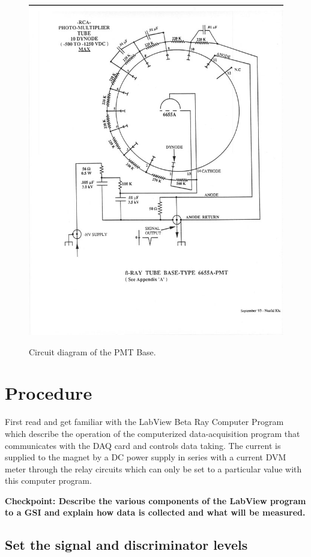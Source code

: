 \documentclass{../lab}
\begin{document}
\begin{figure}[h]
    \centering
    \href{http://experimentationlab.berkeley.edu/sites/default/files/images/RCA6655A_PMT_3.jpg}{\includegraphics[width=0.5\linewidth]{images/RCA6655A_PMT_3.jpg}}
    \caption{Circuit diagram of the PMT Base.}
    \label{fig:RCA6655A_PMT_3}
\end{figure}

\section{Procedure}

First read and get familiar with the LabView Beta Ray Computer Program  \cite{Siegbahn} which describe the operation of the computerized data-acquisition program that communicates with the DAQ card and controls data taking. The current is supplied to the magnet by a DC power supply in series with a current DVM meter through the relay circuits which can only be set to a particular value with this computer program.

\textbf{Checkpoint: Describe the various components of the LabView program to a GSI and explain how data is collected and what will be measured.}

\subsection{Set the signal and discriminator levels}
\end{document}
